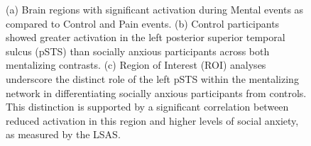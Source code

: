 \begin{figure}[!ht]
	\centering
	\caption{(a) Brain regions with significant activation during Mental events as compared to Control and Pain events. (b) Control participants showed greater activation in the left posterior superior temporal sulcus (pSTS) than socially anxious participants across both mentalizing contrasts. (c) Region of Interest (ROI) analyses underscore the distinct role of the left pSTS within the mentalizing network in differentiating socially anxious participants from controls. This distinction is supported by a significant correlation between reduced activation in this region and higher levels of social anxiety, as measured by the LSAS.}
    \vspace*{-10pt}
	\label{fig:fmri-results}
\end{figure}


